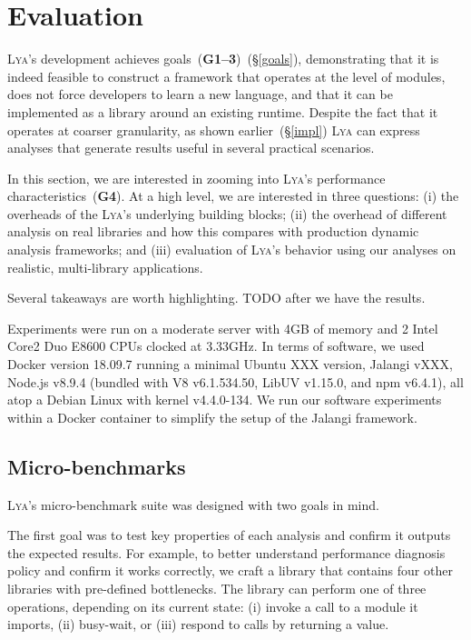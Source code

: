 \documentclass[letterpaper,twocolumn,10pt]{article}
\newcommand{\sx}[1]{(\S\ref{#1})}
\newcommand{\sys}{{\scshape Lya}\xspace}
\newcommand{\goal}[1]{(\textbf{G#1})\xspace}
\newcommand{\fixme}[1]{{\color{red}#1}}
\begin{document}
\section{Evaluation}
\label{eval}

\sys's  development achieves goals~\goal{1--3}~\sx{goals}, demonstrating that it is indeed feasible to construct a framework that operates at the level of modules, 
does not force developers to learn a new language, and that it can be implemented as a library around an existing runtime.
Despite the fact that it operates at coarser granularity, as shown earlier~\sx{impl} \sys can express analyses that generate results useful in several practical scenarios.

In this section, we are interested in zooming into \sys's performance characteristics~\goal{4}.
At a high level, we are interested in three questions:
(i) the overheads of the \sys's underlying building blocks;
(ii) the overhead of different analysis on real libraries and how this compares with production dynamic analysis frameworks; and
(iii) evaluation of \sys's behavior using our analyses on realistic, multi-library applications.

Several takeaways are worth highlighting.
\fixme{TODO after we have the results.}

Experiments were run on a moderate server with 4GB of memory and 2 Intel Core2 Duo E8600 CPUs clocked at 3.33GHz.
In terms of software, we used Docker version 18.09.7 running \fixme{a minimal Ubuntu XXX version}, Jalangi \fixme{vXXX}, Node.js v8.9.4 (bundled with V8 v6.1.534.50, LibUV v1.15.0, and npm v6.4.1), all atop a Debian Linux with kernel v4.4.0-134.
We run our software experiments within a Docker container to simplify the setup of the Jalangi framework.

\subsection{Micro-benchmarks}
\label{micro}

\sys's micro-benchmark suite was designed with two goals in mind.

The first goal was to test key properties of each analysis and confirm it outputs the expected results.
For example, to better understand performance diagnosis policy and confirm it works correctly, we craft a library that contains four other libraries with pre-defined bottlenecks.
The library can perform one of three operations, depending on its current state:
  (i) invoke a call to a module it imports,
  (ii) busy-wait, or
  (iii) respond to calls by returning a value.
\end{document}
